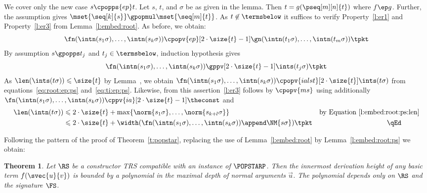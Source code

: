 \documentclass{LMCS}
\newtheorem{theorem}[thm]{Theorem}
\begin{document}
  We cover only the new case $s \cpopps{ep} t$.
  Let $s$, $t$, and $\sigma$ be as given in the lemma.
    Then $t = g(\pseq[m][n]{t})$ where $f \ep g$.
    Further, the assumption gives
    $\mset{\seq[k]{s}} \gpopmul \mset{\seq[m]{t}}$.
    As $t \not \in \termsbelow$ 
    it suffices to verify Property~\ref{l:er1} and Property~\ref{l:er3}
    from Lemma~\ref{l:embed:root}.
    As before, we obtain:
    \begin{equation}
      \label{eq:root:ep:ps}
      \fn(\intn(s_1\sigma), \dots, \intn(s_k\sigma)) \cpopv{ep}[2\cdot\size{t} -1] \gn(\intn(t_1\sigma), \dots, \intn(t_m\sigma)) \tpkt
    \end{equation}
By assumption $s \gpopps t_j$ and $t_j \in \termsbelow$, induction hypothesis gives 
    \begin{equation}
      \label{eq:ti:ep:ps}
      \fn(\intn(s_1\sigma), \dots, \intn(s_k\sigma)) \gppv[2\cdot\size{t} -1] \ints(t_j\sigma) \tpkt
    \end{equation}
    As $\len(\ints(t\sigma)) \leqslant \size{t}$ by Lemma~, 
    we obtain $\fn(\intn(s_1\sigma), \dots, \intn(s_k\sigma)) \cpopv{ialst}[2\cdot\size{t}] \ints(t\sigma)$
    from equations~\eqref{eq:root:ep:ps} and~\eqref{eq:ti:ep:ps}.
Likewise, from this assertion~\ref{l:er3} follows by $\cpopv{ms}$ using additionally 
    $\fn(\intn(s_1\sigma), \dots, \intn(s_k\sigma)) \cppv{ia}[2\cdot\size{t}-1] \theconst$
    and
    \begin{align*}
      \len(\intn(t\sigma)) 
      & \leqslant 2\cdot\size{t} + \max \{ \norm{s_1\sigma}, \dots, \norm{s_{k+l}\sigma} \}
      && \text{by Equation~\eqref{l:embed:root:ps:len}} \\
      & \leqslant 2\cdot\size{t} + \width(\fn(\intn(s_1\sigma), \dots, \intn(s_k\sigma)) \append \NM{s\sigma}) \tpkt\rlap{\hbox to 129 pt{\hfill\qEd}}
    \end{align*}\vspace{-3 pt}



\noindent Following the pattern of the proof of Theorem~\ref{t:popstar}, replacing
the use of Lemma~\ref{l:embed:root} by Lemma~\ref{l:embed:root:ps} we obtain:
\begin{theorem}\label{t:popstarps}
  Let $\RS$ be a constructor TRS compatible with an instance of $\POPSTARP$.
Then the innermost derivation height of any basic term 
  $f(\svec{u}{v})$ is bounded by a polynomial in the 
  maximal depth of normal arguments $\vec{u}$.
  The polynomial depends only on $\RS$ and the signature $\FS$.
\end{theorem}
\end{document}
